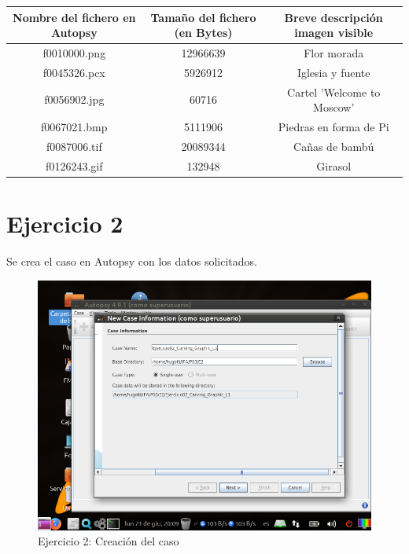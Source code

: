 \documentclass[11pt]{article}
\begin{document}
\begin{table}[H]
    \centering
    \begin{tabular}{|c|c|c|}
        \hline
        Nombre del fichero en Autopsy & Tamaño del fichero (en Bytes) & Breve descripción imagen visible \\
        \hline\hline
        f0010000.png & 12966639 & Flor morada \\
        \hline
        f0045326.pcx & 5926912 & Iglesia y fuente \\
        \hline
        f0056902.jpg & 60716 & Cartel 'Welcome to Moscow' \\
        \hline
        f0067021.bmp & 5111906 & Piedras en forma de Pi \\
        \hline
        f0087006.tif & 20089344 & Cañas de bambú \\
        \hline
        f0126243.gif & 132948 & Girasol \\
        \hline
    \end{tabular}
\end{table}

\section{Ejercicio 2}
Se crea el caso en Autopsy con los datos solicitados.

\begin{figure}[H]
    \caption{Ejercicio 2: Creación del caso}
    \centering
    \includegraphics[scale=0.7]{e2-1.png}
\end{figure}
\end{document}
